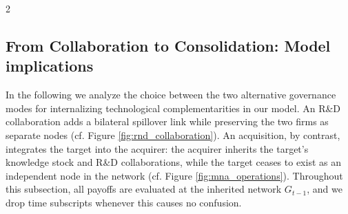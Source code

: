 \documentclass[12pt]{article}
\begin{document}
\begin{spacing}{2}
\subsection{From Collaboration to Consolidation: Model implications}
\label{sec:model-implications}
In the following we analyze the choice between the two alternative governance modes for internalizing technological complementarities in our model. An R\&D collaboration adds a bilateral spillover link while preserving the two firms as separate nodes (cf. Figure \ref{fig:rnd_collaboration}). An acquisition, by contrast, integrates the target into the acquirer: the acquirer inherits the target's knowledge stock and R\&D collaborations, while the target ceases to exist as an independent node in the network (cf. Figure \ref{fig:mna_operations}). Throughout this subsection, all payoffs are evaluated at the inherited network $G_{t-1}$, and we drop time subscripts whenever this causes no confusion.


\end{spacing}
\end{document}
